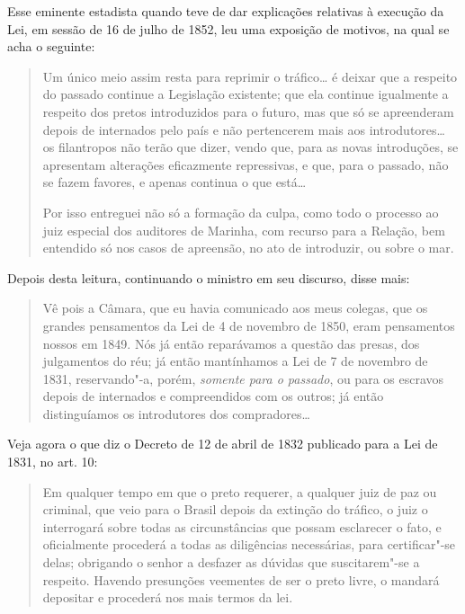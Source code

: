 Esse eminente estadista quando teve de dar explicações relativas à
execução da Lei, em sessão de 16 de julho de 1852, leu uma exposição de
motivos, na qual se acha o seguinte:

\begin{quote}
Um único meio assim resta para reprimir o tráfico\ldots{} é deixar que a
respeito do passado continue a Legislação existente; que ela continue
igualmente a respeito dos pretos introduzidos para o futuro, mas que só
se apreenderam depois de internados pelo 
país  
e não pertencerem mais aos introdutores\ldots{} os filantropos não
terão que dizer, vendo que, para as
novas introduções, se
apresentam alterações eficazmente repressivas, e
que, para o passado, não se fazem favores, e apenas continua o que
está\ldots{}

Por isso entreguei não só a formação da culpa, como todo o processo ao
juiz especial dos auditores de Marinha, com recurso para a Relação, bem
entendido só nos casos de apreensão, no ato de introduzir, ou sobre o
mar.
\end{quote}

Depois desta leitura, continuando o ministro em seu discurso, disse mais:

\begin{quote}
Vê pois a Câmara, que eu havia comunicado aos meus colegas, que os
grandes pensamentos da Lei de 4 de novembro de 1850, eram pensamentos
nossos em 1849. Nós já então reparávamos a questão das presas, dos
julgamentos do réu; já então mantínhamos a Lei de 7 de novembro de 1831,
reservando"-a, porém, \emph{somente para o passado}, ou para os escravos
depois de internados e compreendidos com os outros; já então
distinguíamos os introdutores dos compradores\ldots{}
\end{quote}

Veja agora o que diz o Decreto de 12 de abril de 1832 publicado para a
Lei de 1831, no art. 10:

\begin{quote}
Em qualquer tempo em que o preto requerer, a qualquer juiz de paz ou
criminal, que veio para o Brasil depois da extinção do tráfico, o juiz o
interrogará sobre todas as circunstâncias que possam esclarecer o fato,
e oficialmente procederá a todas as diligências necessárias, para
certificar"-se delas; obrigando o senhor a desfazer as dúvidas que
suscitarem"-se a respeito. Havendo presunções veementes de ser o preto
livre, o mandará depositar e procederá nos mais termos da lei.
\end{quote}


